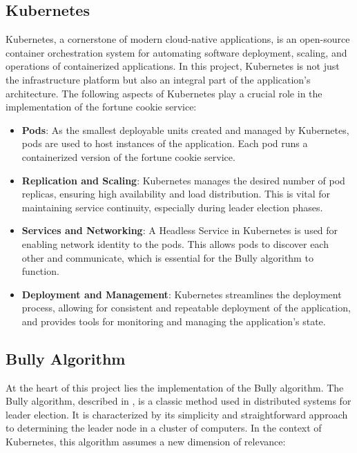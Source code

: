 \documentclass{article}
\begin{document}
  \subsection{Kubernetes}
    Kubernetes, a cornerstone of modern cloud-native applications, is an open-source container orchestration system for automating software deployment, scaling, and operations of containerized applications. In this project, Kubernetes is not just the infrastructure platform but also an integral part of the application's architecture. The following aspects of Kubernetes play a crucial role in the implementation of the fortune cookie service:
    \begin{itemize}
      \item \textbf{Pods}: As the smallest deployable units created and managed by Kubernetes, pods are used to host instances of the application. Each pod runs a containerized version of the fortune cookie service.
      \item \textbf{Replication and Scaling}: Kubernetes manages the desired number of pod replicas, ensuring high availability and load distribution. This is vital for maintaining service continuity, especially during leader election phases.
      \item \textbf{Services and Networking}: A Headless Service in Kubernetes is used for enabling network identity to the pods. This allows pods to discover each other and communicate, which is essential for the Bully algorithm to function.
      \item \textbf{Deployment and Management}: Kubernetes streamlines the deployment process, allowing for consistent and repeatable deployment of the application, and provides tools for monitoring and managing the application's state.
    \end{itemize}
  
  \subsection{Bully Algorithm}
    At the heart of this project lies the implementation of the Bully algorithm.
    The Bully algorithm, described in \cite{molina:1982}, is a classic method used in distributed systems for leader election. It is characterized by its simplicity and straightforward approach to determining the leader node in a cluster of computers. In the context of Kubernetes, this algorithm assumes a new dimension of relevance:
  
\end{document}
